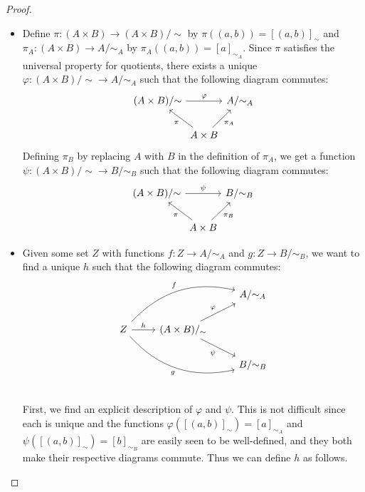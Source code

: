 \documentclass{article}
\theoremstyle{definition}
\begin{document}
\begin{proof}\
	\begin{itemize}
		\item Define $\pi : (A \times B) \to (A \times B)/{\sim}$ by $\pi((a, b)) = [(a, b)]_{\sim}$ and $\pi_A : (A \times B) \to A/{\sim_A}$ by $\pi_A((a, b)) = [a]_{\sim_A}$.
		      Since $\pi$ satisfies the universal property for quotients, there exists a unique $\varphi : (A \times B)/{\sim} \to A/{\sim_A}$ such that the following diagram commutes: \begin{equation*}
			      \begin{tikzcd}[column sep=0]
				      (A \times B) / {\sim} \arrow[rr, "\varphi"] & & A/{\sim_A} \\
				      & A \times B \arrow[ul, "\pi"] \arrow[ur, "\pi_A"']
			      \end{tikzcd}
		      \end{equation*}
		      Defining $\pi_B$ by replacing $A$ with $B$ in the definition of $\pi_A$, we get a function $\psi : (A \times B)/{\sim} \to B/{\sim_B}$ such that the following diagram commutes: \begin{equation*}
			      \begin{tikzcd}[column sep=0]
				      (A \times B) / {\sim} \arrow[rr, "\psi"] & & B/{\sim_B} \\
				      & A \times B \arrow[ul, "\pi"] \arrow[ur, "\pi_B"']
			      \end{tikzcd}
		      \end{equation*}
		\item Given some set $Z$ with functions $f: Z \to A/{\sim_A}$ and $g: Z \to B/{\sim_B}$, we want to find a unique $h$ such that the following diagram commutes: \begin{equation*}
			      \begin{tikzcd}
				      & & A/{\sim_A} \\
				      Z \arrow[urr, bend left, "f"] \arrow[r, "h"] \arrow[drr, bend right, "g"'] & (A \times B)/_{\sim} \arrow[ur, "\varphi"] \arrow[dr, "\psi"'] \\
				      & & B/{\sim_B} \\
			      \end{tikzcd}
		      \end{equation*}

		      First, we find an explicit description of $\varphi$ and $\psi$.
		      This is not difficult since each is unique and the functions $\varphi([(a, b)]_{\sim}) = [a]_{\sim_A}$ and $\psi([(a, b)]_{\sim}) = [b]_{\sim_B}$ are easily seen to be well-defined, and they both make their respective diagrams commute.
		      Thus we can define $h$ as follows.


\end{itemize}
\end{proof}
\end{document}
